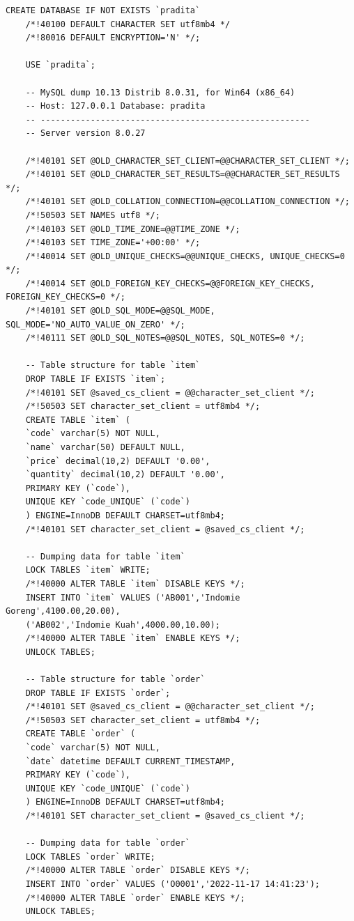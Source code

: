 \begin{lstlisting}[style=JavaStyle]
	CREATE DATABASE IF NOT EXISTS `pradita`
	/*!40100 DEFAULT CHARACTER SET utf8mb4 */ 
	/*!80016 DEFAULT ENCRYPTION='N' */;
	
	USE `pradita`;
	
	-- MySQL dump 10.13 Distrib 8.0.31, for Win64 (x86_64)
	-- Host: 127.0.0.1 Database: pradita
	-- ------------------------------------------------------
	-- Server version 8.0.27
	
	/*!40101 SET @OLD_CHARACTER_SET_CLIENT=@@CHARACTER_SET_CLIENT */;
	/*!40101 SET @OLD_CHARACTER_SET_RESULTS=@@CHARACTER_SET_RESULTS */;
	/*!40101 SET @OLD_COLLATION_CONNECTION=@@COLLATION_CONNECTION */;
	/*!50503 SET NAMES utf8 */;
	/*!40103 SET @OLD_TIME_ZONE=@@TIME_ZONE */;
	/*!40103 SET TIME_ZONE='+00:00' */;
	/*!40014 SET @OLD_UNIQUE_CHECKS=@@UNIQUE_CHECKS, UNIQUE_CHECKS=0 */;
	/*!40014 SET @OLD_FOREIGN_KEY_CHECKS=@@FOREIGN_KEY_CHECKS, FOREIGN_KEY_CHECKS=0 */;
	/*!40101 SET @OLD_SQL_MODE=@@SQL_MODE, SQL_MODE='NO_AUTO_VALUE_ON_ZERO' */;
	/*!40111 SET @OLD_SQL_NOTES=@@SQL_NOTES, SQL_NOTES=0 */;
	
	-- Table structure for table `item`
	DROP TABLE IF EXISTS `item`;
	/*!40101 SET @saved_cs_client = @@character_set_client */;
	/*!50503 SET character_set_client = utf8mb4 */;
	CREATE TABLE `item` (
	`code` varchar(5) NOT NULL,
	`name` varchar(50) DEFAULT NULL,
	`price` decimal(10,2) DEFAULT '0.00',
	`quantity` decimal(10,2) DEFAULT '0.00',
	PRIMARY KEY (`code`),
	UNIQUE KEY `code_UNIQUE` (`code`)
	) ENGINE=InnoDB DEFAULT CHARSET=utf8mb4;
	/*!40101 SET character_set_client = @saved_cs_client */;
	
	-- Dumping data for table `item`
	LOCK TABLES `item` WRITE;
	/*!40000 ALTER TABLE `item` DISABLE KEYS */;
	INSERT INTO `item` VALUES ('AB001','Indomie Goreng',4100.00,20.00),
	('AB002','Indomie Kuah',4000.00,10.00);
	/*!40000 ALTER TABLE `item` ENABLE KEYS */;
	UNLOCK TABLES;
	
	-- Table structure for table `order`
	DROP TABLE IF EXISTS `order`;
	/*!40101 SET @saved_cs_client = @@character_set_client */;
	/*!50503 SET character_set_client = utf8mb4 */;
	CREATE TABLE `order` (
	`code` varchar(5) NOT NULL,
	`date` datetime DEFAULT CURRENT_TIMESTAMP,
	PRIMARY KEY (`code`),
	UNIQUE KEY `code_UNIQUE` (`code`)
	) ENGINE=InnoDB DEFAULT CHARSET=utf8mb4;
	/*!40101 SET character_set_client = @saved_cs_client */;
	
	-- Dumping data for table `order`
	LOCK TABLES `order` WRITE;
	/*!40000 ALTER TABLE `order` DISABLE KEYS */;
	INSERT INTO `order` VALUES ('O0001','2022-11-17 14:41:23');
	/*!40000 ALTER TABLE `order` ENABLE KEYS */;
	UNLOCK TABLES;
	

\end{lstlisting}
